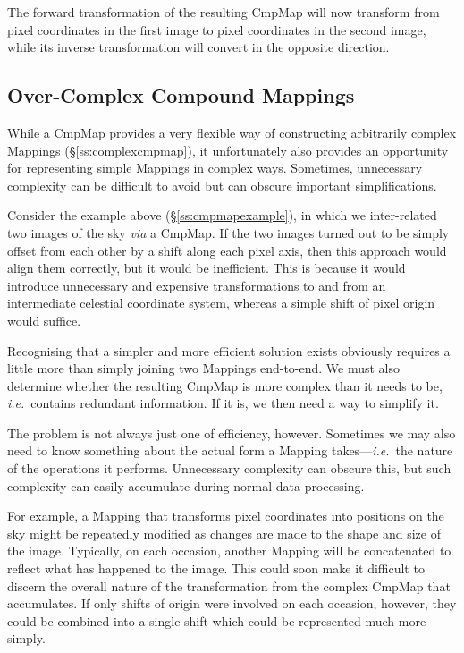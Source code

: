 \documentclass[twoside,11pt]{starlink}
\providecommand{\secref}[1]{\S\ref{#1}}
\begin{document}
The forward transformation of the resulting CmpMap will now transform
from pixel coordinates in the first image to pixel coordinates in the
second image, while its inverse transformation will convert in the
opposite direction.

\subsection{\label{ss:overcomplexcmpmaps}Over-Complex Compound Mappings}

While a CmpMap provides a very flexible way of constructing
arbitrarily complex Mappings (\secref{ss:complexcmpmap}), it
unfortunately also provides an opportunity for representing simple
Mappings in complex ways. Sometimes, unnecessary complexity can be
difficult to avoid but can obscure important simplifications.

Consider the example above (\secref{ss:cmpmapexample}), in which we
inter-related two images of the sky \emph{via} a CmpMap.  If the two
images turned out to be simply offset from each other by a shift along
each pixel axis, then this approach would align them correctly, but it
would be inefficient. This is because it would introduce unnecessary
and expensive transformations to and from an intermediate celestial
coordinate system, whereas a simple shift of pixel origin would
suffice.

Recognising that a simpler and more efficient solution exists
obviously requires a little more than simply joining two Mappings
end-to-end. We must also determine whether the resulting CmpMap is
more complex than it needs to be, \emph{i.e.}\ contains redundant
information. If it is, we then need a way to simplify it.

The problem is not always just one of efficiency, however. Sometimes
we may also need to know something about the actual form a Mapping
takes---\emph{i.e.}\ the nature of the operations it performs.
Unnecessary complexity can obscure this, but such complexity can
easily accumulate during normal data processing.

For example, a Mapping that transforms pixel coordinates into
positions on the sky might be repeatedly modified as changes are made
to the shape and size of the image. Typically, on each occasion,
another Mapping will be concatenated to reflect what has happened to
the image. This could soon make it difficult to discern the overall
nature of the transformation from the complex CmpMap that
accumulates. If only shifts of origin were involved on each occasion,
however, they could be combined into a single shift which could be
represented much more simply.
\end{document}
